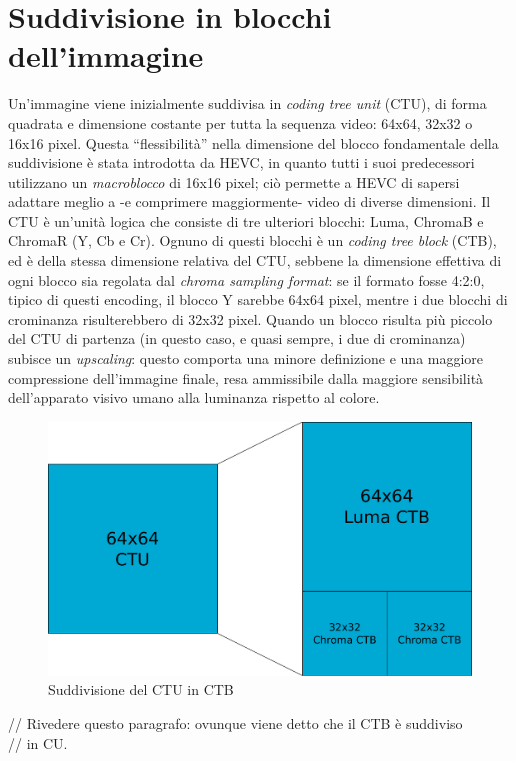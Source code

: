 \section{Suddivisione in blocchi dell'immagine} 
Un'immagine viene inizialmente suddivisa in \emph{coding tree unit} (CTU), di 
forma quadrata e dimensione costante per tutta la sequenza video: 64x64, 32x32 
o 16x16 pixel. Questa ``flessibilità'' nella dimensione del blocco fondamentale 
della suddivisione è stata introdotta da HEVC, in quanto tutti i suoi 
predecessori utilizzano un \emph{macroblocco} di 16x16 pixel; ciò permette a 
HEVC di sapersi adattare meglio a -e comprimere maggiormente- video di diverse 
dimensioni.
Il CTU è un'unità logica che consiste di tre ulteriori blocchi: Luma, 
ChromaB e ChromaR (Y, Cb e Cr). Ognuno di questi blocchi è un 
\emph{coding tree block} (CTB), ed è della stessa dimensione relativa 
del CTU, sebbene la dimensione effettiva di ogni blocco sia regolata dal 
\emph{chroma sampling format}: se il formato fosse 4:2:0, tipico di questi 
encoding, il blocco Y sarebbe 64x64 pixel, mentre i due blocchi di crominanza 
risulterebbero di 32x32 pixel. Quando un blocco risulta più piccolo del 
CTU di partenza (in questo caso, e quasi sempre, i due di crominanza) 
subisce un \emph{upscaling}: questo comporta una minore definizione e una 
maggiore compressione dell'immagine finale, resa ammissibile dalla maggiore 
sensibilità dell'apparato visivo umano alla luminanza rispetto al colore.
\begin{figure}[H]
  \centering
    \includegraphics[scale=0.20]{Figures/CTU-CTB}
  \caption{Suddivisione del CTU in CTB}
\end{figure}
// Rivedere questo paragrafo: ovunque viene detto che il CTB è suddiviso \\
// in CU. \\
